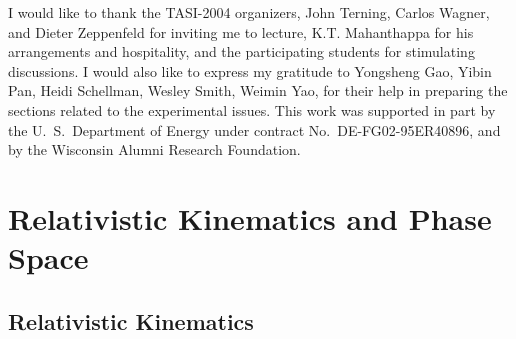 \documentclass[prd,aps,floats,preprintnumbers,preprint,superscriptaddress,floatfix,nofootinbib]{revtex4}
\begin{document}
\begin{acknowledgments}
I would like to thank the TASI-2004 organizers, John Terning, Carlos Wagner,
and Dieter Zeppenfeld for inviting me to lecture,  K.T. Mahanthappa for his 
arrangements and hospitality,
and the participating students for stimulating discussions. I would also
like to express my gratitude to Yongsheng Gao, Yibin Pan, Heidi Schellman,
Wesley Smith, Weimin Yao, for their help in preparing the sections related to
the experimental issues. This work was supported in part
by the U.~S.~Department of Energy under contract No.~DE-FG02-95ER40896,
and by the Wisconsin Alumni Research Foundation.
\end{acknowledgments}

\appendix

\section{ Relativistic Kinematics and Phase Space }
\label{app-ps}

\subsection{Relativistic Kinematics}
\end{document}
